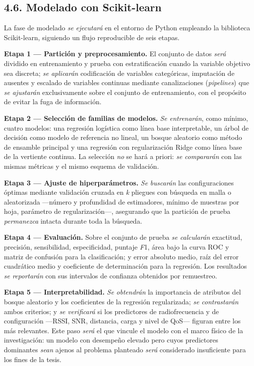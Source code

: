 \documentclass[
  12pt,
]{article}
\begin{document}
\subsection{4.6. Modelado con
Scikit-learn}\label{modelado-con-scikit-learn}

La fase de modelado \emph{se ejecutará} en el entorno de Python
empleando la biblioteca Scikit-learn, siguiendo un flujo reproducible de
seis etapas.

\textbf{Etapa 1 — Partición y preprocesamiento.} El conjunto de datos
\emph{será} dividido en entrenamiento y prueba con estratificación
cuando la variable objetivo sea discreta; \emph{se aplicarán}
codificación de variables categóricas, imputación de ausentes y escalado
de variables continuas mediante canalizaciones (\emph{pipelines}) que
\emph{se ajustarán} exclusivamente sobre el conjunto de entrenamiento,
con el propósito de evitar la fuga de información.

\textbf{Etapa 2 — Selección de familias de modelos.} \emph{Se
entrenarán}, como mínimo, cuatro modelos: una regresión logística como
línea base interpretable, un árbol de decisión como modelo de referencia
no lineal, un bosque aleatorio como método de ensamble principal y una
regresión con regularización Ridge como línea base de la vertiente
continua. La selección \emph{no} se hará a priori: \emph{se compararán}
con las mismas métricas y el mismo esquema de validación.

\textbf{Etapa 3 — Ajuste de hiperparámetros.} \emph{Se buscarán} las
configuraciones óptimas mediante validación cruzada en \emph{k} pliegues
con búsqueda en malla o aleatorizada —número y profundidad de
estimadores, mínimo de muestras por hoja, parámetro de regularización—,
asegurando que la partición de prueba \emph{permanezca} intacta durante
toda la búsqueda.

\textbf{Etapa 4 — Evaluación.} Sobre el conjunto de prueba \emph{se
calcularán} exactitud, precisión, sensibilidad, especificidad, puntaje
\emph{F}1, área bajo la curva ROC y matriz de confusión para la
clasificación; y error absoluto medio, raíz del error cuadrático medio y
coeficiente de determinación para la regresión. Los resultados \emph{se
reportarán} con sus intervalos de confianza obtenidos por remuestreo.

\textbf{Etapa 5 — Interpretabilidad.} \emph{Se obtendrán} la importancia
de atributos del bosque aleatorio y los coeficientes de la regresión
regularizada; \emph{se contrastarán} ambos criterios; y \emph{se
verificará} si los predictores de radiofrecuencia y de configuración
—RSSI, SNR, distancia, carga y nivel de QoS— figuran entre los más
relevantes. Este paso \emph{será} el que vincule el modelo con el marco
físico de la investigación: un modelo con desempeño elevado pero cuyos
predictores dominantes \emph{sean} ajenos al problema planteado
\emph{será} considerado insuficiente para los fines de la tesis.
\end{document}
